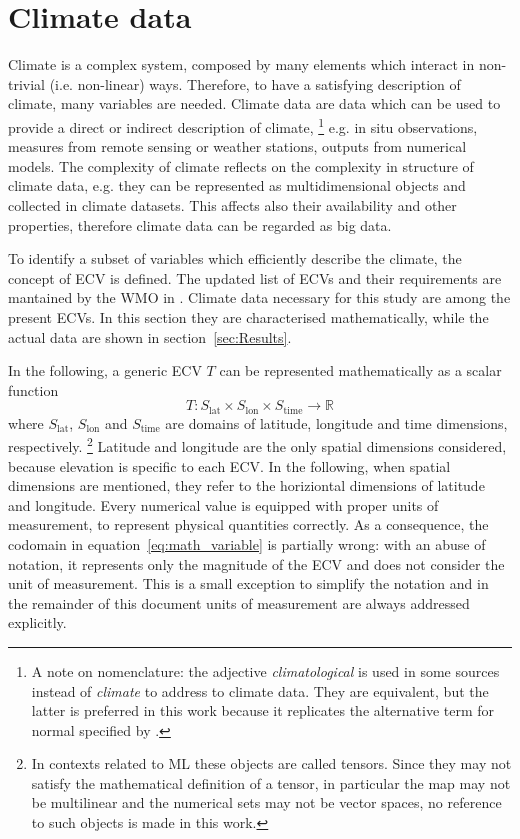 \section{Climate data}
\label{sec:Climate data}
Climate is a complex system, composed by many elements which interact in non-trivial (i.e. non-linear) ways. Therefore, to have a satisfying description of climate, many variables are needed. Climate data are data which can be used to provide a direct or indirect description of climate,%
\footnote{A note on nomenclature: the adjective \emph{climatological} is used in some sources instead of \emph{climate} to address to climate data. They are equivalent, but the latter is preferred in this work because it replicates the alternative term for \gls{normal} specified by \cite[1]{2017WorldMeteorologicalOrganizationWMOWMOGuidelines}.}
e.g. in situ observations, measures from remote sensing or weather stations, outputs from numerical models.\cite[1537]{2021SeneviratneWeatherAnd} The complexity of climate reflects on the complexity in structure of climate data, e.g. they can be represented as multidimensional objects and collected in climate datasets. This affects also their availability and other properties,\cite{2014FaghmousABig} therefore climate data can be regarded as big data.

To identify a subset of variables which efficiently describe the climate, the concept of \gls{ECV} is defined.\cite{2014BojinskiTheConcept} The updated list of \glspl{ECV} and their requirements are mantained by the \gls{WMO} in \cite[14-17]{2022WorldMeteorologicalOrganizationWMOThe2022}.
Climate data necessary for this study are among the present \glspl{ECV}. In this section they are characterised mathematically, while the actual data are shown in section~\ref{sec:Results}.

In the following, a generic \gls{ECV} $T$ can be represented mathematically as a scalar function
\begin{equation}
  \label{eq:math_variable}
  T : S_\text{lat} \times S_\text{lon} \times S_\text{time} \to \mathbb{R}
\end{equation}
where $S_\text{lat}$, $S_\text{lon}$ and $S_\text{time}$ are domains of latitude, longitude and time dimensions, respectively.%
\footnote{In contexts related to \gls{ML} these objects are called tensors. Since they may not satisfy the mathematical definition of a tensor, in particular the map may not be multilinear and the numerical sets may not be vector spaces, no reference to such objects is made in this work.}
Latitude and longitude are the only spatial dimensions considered, because elevation is specific to each \gls{ECV}. In the following, when spatial dimensions are mentioned, they refer to the horiziontal dimensions of latitude and longitude.
Every numerical value is equipped with proper units of measurement, to represent physical quantities correctly. As a consequence, the codomain in equation~\eqref{eq:math_variable} is partially wrong: with an abuse of notation, it represents only the magnitude of the \gls{ECV} and does not consider the unit of measurement. This is a small exception to simplify the notation and in the remainder of this document units of measurement are always addressed explicitly.

